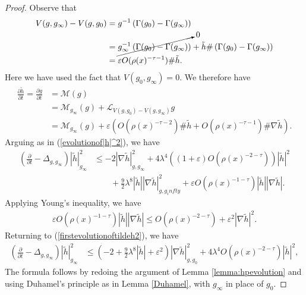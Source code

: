 \documentclass[12pt]{amsart}
\newcommand{\calM}{\mathcal{M}}
\newcommand{\p}{{ \partial}}
\renewcommand{\1}{{\mathbf 1}}
\newcommand{\scrL}{{\mathscr L}}
\renewcommand{\p}{{\partial}}
\newcommand{\eps}{{\varepsilon}}
\theoremstyle{others}
\numberwithin{equation}{section}
\begin{document}
\begin{proof}
    Observe that
    \begin{equation}
    \begin{split}
    V(g,g_\infty) - V(g,g_0) & = g^{-1} \left( \Gamma(g_0) - \Gamma(g_\infty) \right) \\
    & = \cancelto{0}{g_\infty^{-1} \left( \Gamma(g_0) - \Gamma(g_\infty) \right)} + \tilde{h} \# \left( \Gamma(g_0) - \Gamma(g_\infty) \right) \\
    & = \eps O(\rho(x)^{-\tau-1} ) \# \tilde{h}.
    \end{split}
    \end{equation}
    Here we have used the fact that $V(g_0,g_\infty) = 0.$
    We therefore have
    \begin{equation*}
    \begin{split}
   \frac{\p \tilde{h}}{\p t} = \frac{\p g}{\p t} & = \mathcal{M}(g) \\
   & = \calM_{g_\infty}(g) + \scrL_{V(g,g_0) - V(g,g_\infty)} g \\
   & = \calM_{g_\infty}(g) + \eps \left( O(\rho(x)^{-\tau-2} ) \# \tilde{h} + O(\rho(x)^{-\tau-1} ) \# \nabla \tilde{h} \right).
   \end{split}
    \end{equation*}
    Arguing as in (\ref{evolutionof|h|^2}), we have
         \begin{equation}\label{firstevolutionoftildeh2}
       \begin{split}
           \left( \frac{\p}{\p t} - \Delta_{g, g_\infty} \right) |\tilde{h}|_{g_\infty}^2 & \leq - 2 |\nabla \tilde{h}|_{g,g_\infty}^2 + 4 \lambda^4 \left( (1 + \eps ) O(\rho(x)^{-2 -\tau}) \right) |\tilde{h}|^2 \\
           & \qquad + \frac{9}{2} \lambda^8 |\tilde{h}| |\nabla \tilde{h}|_{g,g_infty}^2 + \eps O(\rho(x)^{-1 - \tau}) |\tilde{h} | | \nabla \tilde{h} |.
       \end{split}
   \end{equation}
   Applying Young's inequality, we have
            \begin{equation}
       \begin{split}
          \eps O(\rho(x)^{-1 - \tau}) |\tilde{h} | | \nabla \tilde{h} | \leq O(\rho(x)^{-2 - \tau}) + \eps^2 |\nabla \tilde{h} |^2.
       \end{split}
   \end{equation}
   Returning to (\ref{firstevolutionoftildeh2}), we have
            \begin{equation}
       \begin{split}
           \left( \frac{\p}{\p t} - \Delta_{g, g_\infty} \right) |\tilde{h}|_{g_\infty}^2 & \leq 
            \left( - 2 +  \frac{9}{2} \lambda^8 |\tilde{h}| + \eps^2 \right) |\nabla \tilde{h}|_{g,g_0}^2 + 4 \lambda^4 O(\rho(x)^{-2-\tau}) |\tilde{h}|^2,
       \end{split}
   \end{equation}
    The formula follows by redoing the argument of Lemma \ref{lemma:hpevolution} and using Duhamel's principle as in Lemma \ref{Duhamel}, with $g_\infty$ in place of $g_0.$
\end{proof}
\end{document}

